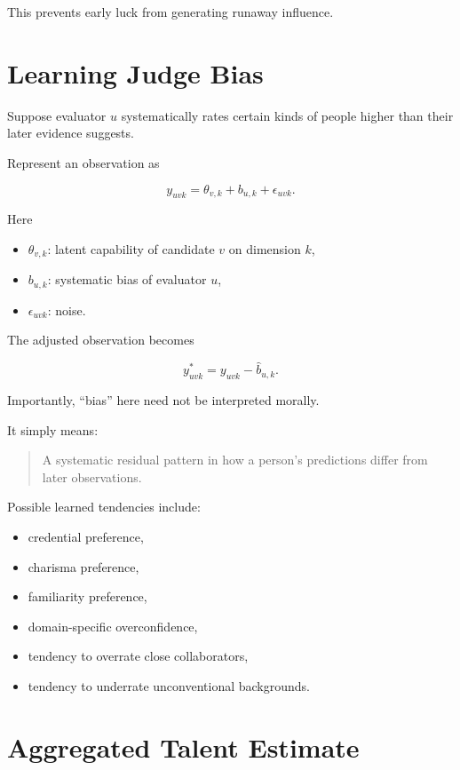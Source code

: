 \documentclass[11pt]{article}
\begin{document}
This prevents early luck from generating runaway influence.

\section{Learning Judge Bias}

Suppose evaluator \(u\) systematically rates certain kinds of people higher
than their later evidence suggests.

Represent an observation as

\[
y_{uvk}
=
\theta_{v,k}
+
b_{u,k}
+
\epsilon_{uvk}.
\]

Here

\begin{itemize}
    \item \(\theta_{v,k}\): latent capability of candidate \(v\) on dimension \(k\),
    \item \(b_{u,k}\): systematic bias of evaluator \(u\),
    \item \(\epsilon_{uvk}\): noise.
\end{itemize}

The adjusted observation becomes

\[
y_{uvk}^{\ast}
=
y_{uvk}
-
\hat b_{u,k}.
\]

Importantly, ``bias'' here need not be interpreted morally.

It simply means:

\begin{quote}
A systematic residual pattern in how a person's predictions differ from later
observations.
\end{quote}

Possible learned tendencies include:

\begin{itemize}
    \item credential preference,
    \item charisma preference,
    \item familiarity preference,
    \item domain-specific overconfidence,
    \item tendency to overrate close collaborators,
    \item tendency to underrate unconventional backgrounds.
\end{itemize}

\section{Aggregated Talent Estimate}
\end{document}
